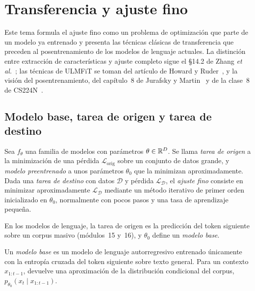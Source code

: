 \chapter{Transferencia y ajuste fino}
\label{tema:1}

Este tema formula el ajuste fino como un problema de optimización que parte de un modelo ya entrenado y presenta las técnicas clásicas de transferencia que preceden al posentrenamiento de los modelos de lenguaje actuales. La distinción entre extracción de características y ajuste completo sigue el §14.2 de Zhang \emph{et al.}~\cite{d2l}; las técnicas de ULMFiT se toman del artículo de Howard y Ruder~\cite[§3.2 y~§3.3]{howard-ruder}, y la visión del posentrenamiento, del capítulo~8 de Jurafsky y Martin~\cite{jm3} y de la clase~8 de CS224N~\cite{cs224n}.

\section{Modelo base, tarea de origen y tarea de destino}

\begin{definicion}\label{def:transferencia}
Sea $f_\theta$ una familia de modelos con parámetros $\theta\in\mathbb{R}^{D}$. Se llama \emph{tarea de origen} a la minimización de una pérdida $\mathcal{L}_{\mathrm{orig}}$ sobre un conjunto de datos grande, y \emph{modelo preentrenado} a unos parámetros $\theta_0$ que la minimizan aproximadamente. Dada una \emph{tarea de destino} con datos $\mathcal{D}$ y pérdida $\mathcal{L}_{\mathcal{D}}$, el \emph{ajuste fino} consiste en minimizar aproximadamente $\mathcal{L}_{\mathcal{D}}$ mediante un método iterativo de primer orden inicializado en $\theta_0$, normalmente con pocos pasos y una tasa de aprendizaje pequeña.
\end{definicion}

En los modelos de lenguaje, la tarea de origen es la predicción del token siguiente sobre un corpus masivo (módulos~15 y~16), y $\theta_0$ define un \emph{modelo base}.

\begin{definicion}\label{def:base}
Un \emph{modelo base} es un modelo de lenguaje autorregresivo entrenado únicamente con la entropía cruzada del token siguiente sobre texto general. Para un contexto $x_{1:t-1}$, devuelve una aproximación de la distribución condicional del corpus, $p_{\theta_0}(x_t\mid x_{1:t-1})$.
\end{definicion}

